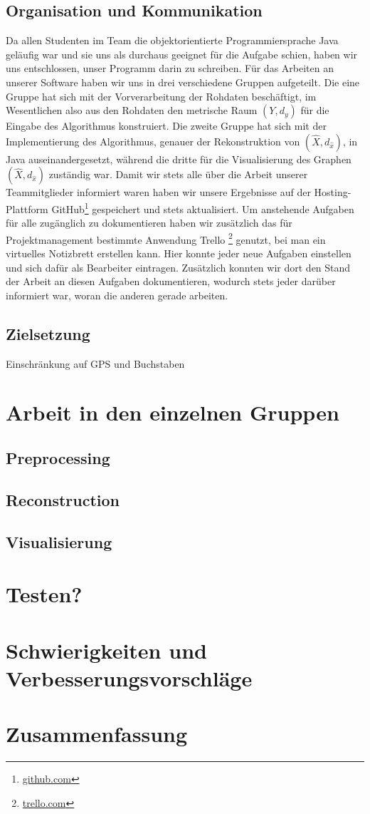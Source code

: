 \documentclass[parskip=half,
 fontsize=12pt, bibtotoc,
 ngerman]
 {article}
\begin{document}
\subsection*{Organisation und Kommunikation}
Da allen Studenten im Team die objektorientierte Programmiersprache Java geläufig war und sie uns als durchaus geeignet für die Aufgabe schien, haben wir uns entschlossen, unser Programm darin zu schreiben. Für das Arbeiten an unserer Software haben wir uns in drei verschiedene Gruppen aufgeteilt. Die eine Gruppe hat sich mit der Vorverarbeitung der Rohdaten beschäftigt, im Wesentlichen also aus den Rohdaten den metrische Raum $\left(Y, d_y\right)$ für die Eingabe des Algorithmus konstruiert. Die zweite Gruppe hat sich mit der Implementierung des Algorithmus, genauer der Rekonstruktion von $(\hat{X}, d_{\hat{x}})$, in Java auseinandergesetzt, während die dritte für die Visualisierung des Graphen $(\hat{X}, d_{\hat{x}})$ zuständig war. Damit wir stets alle über die Arbeit unserer Teammitglieder informiert waren haben wir unsere Ergebnisse auf der Hosting-Plattform GitHub\footnote{\url{github.com}} gespeichert und stets aktualisiert. Um anstehende Aufgaben für alle zugänglich zu dokumentieren haben wir zusätzlich das für Projektmanagement bestimmte Anwendung Trello \footnote{\url{trello.com}} genutzt, bei man ein virtuelles Notizbrett erstellen kann. Hier konnte jeder neue Aufgaben einstellen und sich dafür als Bearbeiter eintragen. Zusätzlich konnten wir dort den Stand der Arbeit an diesen Aufgaben dokumentieren, wodurch stets jeder darüber informiert war, woran die anderen gerade arbeiten. \newline
\subsection*{Zielsetzung}
 Einschränkung auf GPS und Buchstaben\newline
\section{Arbeit in den einzelnen Gruppen}
\subsection{Preprocessing}
\subsection{Reconstruction}
\subsection{Visualisierung}

\section{Testen?}
\section{Schwierigkeiten und Verbesserungsvorschläge}
\section{Zusammenfassung}
\printbibliography
\end{document}
